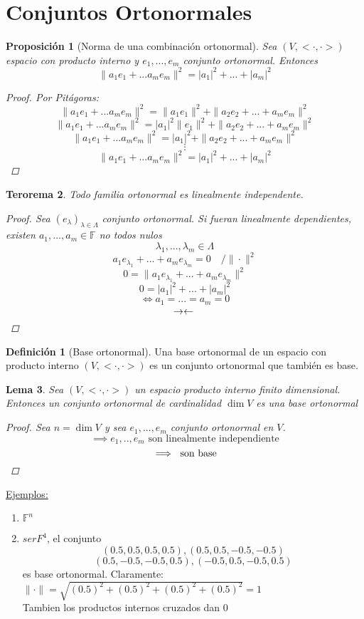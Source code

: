 \documentclass[11pt]{book}
\newcommand{\set}[1]{\mathbb{#1}}
\newcommand{\contr}{\rightarrow\leftarrow}
\newtheorem{thm}{Terorema}[section]
\newtheorem{lem}[thm]{Lema}
\newtheorem{prop}[thm]{Proposición}
\theoremstyle{definition}
\newtheorem{defn}{Definición}[section]
\begin{document}
\section{Conjuntos Ortonormales}

\begin{prop}[Norma de una combinación ortonormal]
	Sea $(V,<\cdot,\cdot>)$ espacio con producto interno y $e_1,...,e_m$ conjunto ortonormal. Entonces
	\[\|a_1e_1+...a_me_m\|^2=|a_1|^2+...+|a_m|^2\]
	\begin{proof}
		Por Pitágoras:
		\[\|a_1e_1+...a_me_m\|^2=\|a_1e_1\|^2+\|a_2e_2+...+a_me_m\|^2\]
		\[\|a_1e_1+...a_me_m\|^2=|a_1|^2\|e_1\|^2+\|a_2e_2+...+a_me_m\|^2\]
		\[\|a_1e_1+...a_me_m\|^2=|a_1|^2+\|a_2e_2+...+a_me_m\|^2\]
		\[\vdots\]
		\[\|a_1e_1+...a_me_m\|^2=|a_1|^2+...+|a_m|^2\]
	\end{proof}
\end{prop}
\begin{thm}
	Todo familia ortonormal es linealmente independente.
	\begin{proof}
		Sea $(e_\lambda)_{\lambda\in\Lambda}$ conjunto ortonormal. Si fueran linealmente dependientes, existen $a_1,...,a_m\in\set{F}$ no todos nulos
		\[\lambda_1,...,\lambda_m\in\Lambda\]
		\[a_1e_{\lambda_1}+...+a_me_{\lambda_m}=0\quad /\|\cdot\|^2\]
		\[0=\|a_1e_{\lambda_1}+...+a_me_{\lambda_m}\|^2\]
		\[0=|a_1|^2+...+|a_m|^2\]
		\[\iff a_1=...=a_m=0\]
		\[\contr\qedhere\]
	\end{proof}
\end{thm}
\begin{defn}[Base ortonormal]
	Una base ortonormal de un espacio con producto interno $(V,<\cdot,\cdot>)$ es un conjunto ortonormal que también es base.
\end{defn}
\begin{lem}
	Sea $(V,<\cdot,\cdot>)$ un espacio producto interno finito dimensional. Entonces un conjunto ortonormal de cardinalidad $\dim V$ es una base ortonormal
	\begin{proof}
		Sea $n=\dim V$ y sea $e_1,...,e_m$ conjunto ortonormal en $V$.
		\[\implies e_1,..,e_m\textrm{ son linealmente independiente}\]
		\[\implies\textrm{ son base}\qedhere\]
	\end{proof}
\end{lem}
\underline{Ejemplos:}
\begin{enumerate}
	\item $\set{F}^n$

	\item $ser{F}^4$, el conjunto
	\[(0.5,0.5,0.5,0.5),(0.5,0.5,-0.5,-0.5)\]
	\[(0.5,-0.5,-0.5,0.5),(-0.5,0.5,-0.5,0.5)\]
	es base ortonormal.
	Claramente: $\|\cdot\|=\sqrt{(0.5)^2+(0.5)^2+(0.5)^2+(0.5)^2}=1$\\
	Tambien los productos internos cruzados dan 0
\end{enumerate}
\end{document}
